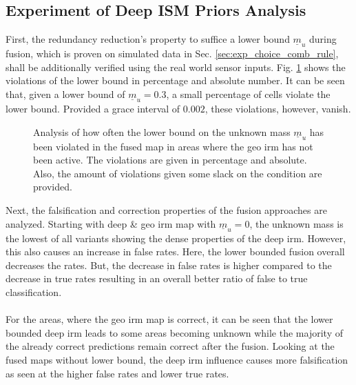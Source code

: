 \subsection{Experiment of Deep ISM Priors Analysis}
\label{subsec:exp_of_prior_analy}
First, the redundancy reduction's property to suffice a lower bound $\underline{m}_u$ during fusion, which is proven on simulated data in Sec. \ref{sec:exp_choice_comb_rule}, shall be additionally verified using the real world sensor inputs. Fig. \ref{tab:prior_violations} shows the violations of the lower bound in percentage and absolute number. It can be seen that, given a lower bound of $\underline{m}_u = 0.3$, a small percentage of cells violate the lower bound. Provided a grace interval of $0.002$, these violations, however, vanish.
\begin{figure}[H]
	\begin{center}
		\caption{\label{tab:prior_violations}Analysis of how often the lower bound on the unknown mass $\underline{m}_u$ has been violated in the fused map in areas where the geo \gls{irm} has not been active. The violations are given in percentage and absolute. Also, the amount of violations given some slack on the condition are provided.}
	\end{center}
\end{figure}
Next, the falsification and correction properties of the fusion approaches are analyzed. Starting with deep \& geo \gls{irm} map with $\underline{m}_u=0$, the unknown mass is the lowest of all variants showing the dense properties of the deep \gls{irm}. However, this also causes an increase in false rates. Here, the lower bounded fusion overall decreases the rates. But, the decrease in false rates is higher compared to the decrease in true rates resulting in an overall better ratio of false to true classification. 
\\\\
For the areas, where the geo \gls{irm} map is correct, it can be seen that the lower bounded deep \gls{irm} leads to some areas becoming unknown while the majority of the already correct predictions remain correct after the fusion. Looking at the fused maps without lower bound, the deep \gls{irm} influence causes more falsification as seen at the higher false rates and lower true rates.
